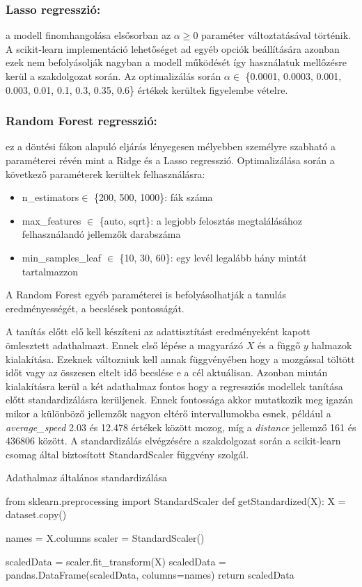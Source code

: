 \subsubsection{Lasso regresszió:} a modell finomhangolása elsősorban az $\alpha \geq 0$ paraméter változtatásával történik. A scikit-learn implementáció lehetőséget ad egyéb opciók beállítására azonban ezek nem befolyásolják nagyban a modell működését így használatuk mellőzésre kerül a szakdolgozat során. Az optimalizálás során $\alpha \in$ \{0.0001, 0.0003, 0.001, 0.003, 0.01, 0.1, 0.3, 0.35, 0.6\} értékek kerültek figyelembe vételre.\\[6pt]

\subsubsection{Random Forest regresszió:} ez a döntési fákon alapuló eljárás lényegesen mélyebben személyre szabható a paraméterei révén mint a Ridge és a Lasso regresszió. Optimalizálása \cite{random-forest-tuning} során a következő paraméterek kerültek felhasználásra:
\begin{itemize}
	\item n\_estimators$\in$ \{200, 500, 1000\}: fák száma
	\item max\_features $\in$ \{auto, sqrt\}: a legjobb felosztás megtalálásához felhasználandó jellemzők darabszáma
	\item min\_samples\_leaf $\in$ \{10, 30, 60\}: egy levél legalább hány mintát tartalmazzon
\end{itemize}
A Random Forest egyéb paraméterei is befolyásolhatják a tanulás eredményességét, a becslések pontosságát. 

A tanítás előtt elő kell készíteni az adattisztítást eredményeként kapott ömlesztett adathalmazt. Ennek első lépése a magyarázó $X$ és a függő $y$ halmazok kialakítása. Ezeknek változniuk kell annak függvényében hogy a mozgással töltött időt vagy az összesen eltelt idő becslése e a cél aktuálisan. Azonban miután kialakításra kerül a két adathalmaz fontos hogy a regressziós modellek tanítása előtt standardizálásra kerüljenek. Ennek fontossága akkor mutatkozik meg igazán mikor a különböző jellemzők nagyon eltérő intervallumokba esnek, például a \textit{average\_speed} 2.03 és 12.478 értékek között mozog, míg a \textit{distance} jellemző 161 és 436806 között. A standardizálás elvégzésére a szakdolgozat során a scikit-learn csomag által biztosított StandardScaler függvény szolgál.
\begin{programreszlet} 	Adathalmaz általános standardizálása
\begin{python}
from sklearn.preprocessing import StandardScaler
def getStandardized(X):
    X = dataset.copy()
	
    names = X.columns
    scaler = StandardScaler()
		
    scaledData = scaler.fit_transform(X)
    scaledData = pandas.DataFrame(scaledData, columns=names)
    return scaledData
\end{python}
\label{prog:movingStandard}
\end{programreszlet}

